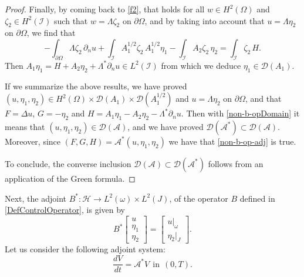 \documentclass[a4paper, 12pt]{article}
\theoremstyle{plain}
\theoremstyle{definition}
\numberwithin{theorem}{section}
\numberwithin{equation}{section}
\begin{document}
{\begin{proof}
Finally, by coming back to \eqref{f2}, that holds for all $w\in H^2(\Omega)$ and $\zeta_2\in H^2(\mathcal{I})$ such that $w=\Lambda \zeta_2$ on $\partial\Omega$, and by taking into account that $u=\Lambda\eta_2$ on $\partial\Omega$, we find that 
$$
-\int_{\partial\Omega} \Lambda \zeta_2\,\partial_n u+\int_{\mathcal{I}} A_1^{1/2} \zeta_2 \, A_1^{1/2}\eta_1-\int_{\mathcal{I}}A_2\zeta_2\,\eta_2=\int_{\mathcal{I}}\zeta_2\,H
.$$
Then $A_1 \eta_1=H+A_2\eta_2 +\Lambda^*\partial_n u\in L^2(\mathcal{I})$ from which we deduce $\eta_1\in \mathcal{D}(A_1)$. 

If we summarize the above results, we have proved $(u,\eta_1,\eta_2)\in H^2(\Omega)\times \mathcal{D}(A_1)\times \mathcal{D}(A_1^{1/2})$ and $u=\Lambda\eta_2$ on $\partial\Omega$, and that $F=\Delta u$, $G=-\eta_2$ and $H=A_1 \eta_1-A_2\eta_2 -\Lambda^*\partial_n u$. Then with  \eqref{non-b-opDomain} it means that $(u,\eta_1,\eta_2)\in \mathcal{D}(\mathcal{A})$, and we have proved $\mathcal{D}(\mathcal{A}^*)\subset \mathcal{D}(\mathcal{A})$. Moreover, since $(F,G,H)=\mathcal{A^*}(u,\eta_1,\eta_2)$ we have that \eqref{non-b-op-adj} is true. 

To conclude,  the converse inclusion $\mathcal{D}(\mathcal{A})\subset \mathcal{D}(\mathcal{A}^*)$ follows from an application of the Green formula. 
\end{proof}

Next, the adjoint $B^*:\mathscr{H}\to L^2(\omega)\times L^2(J)$, of the operator $B$ defined in \eqref{DefControlOperator}, is given by
\begin{equation}\label{DefControlOperatorAdj}B^*\begin{bmatrix}
u\\
\eta_1\\
\eta_2 \end{bmatrix}
=\begin{bmatrix}
u|_\omega\\
\eta_2|_J \end{bmatrix}.
\end{equation}
Let us consider the following adjoint system:
\begin{equation}\label{sys-simple_eta}
\frac{d V}{dt}=\mathcal{A}^*V~~\text{in}~~(0,T).
\end{equation}

}
\end{document}
